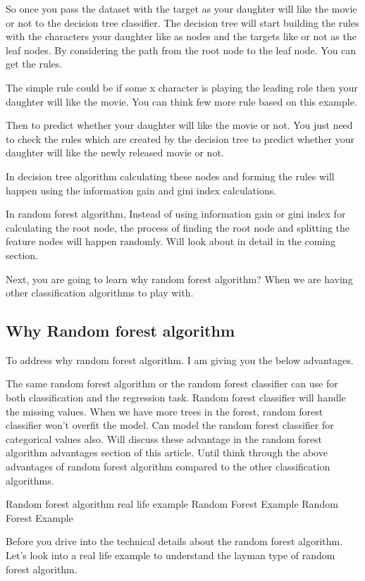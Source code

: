 \documentclass[a4paper,12pt]{article}
\begin{document}
So once you pass the dataset with the target as your daughter will like the movie or not to the decision tree classifier. The decision tree will start building the rules with the characters your daughter like as nodes and the targets like or not as the leaf nodes. By considering the path from the root node to the leaf node. You can get the rules.

The simple rule could be if some x character is playing the leading role then your daughter will like the movie. You can think few more rule based on this example.

Then to predict whether your daughter will like the movie or not. You just need to check the rules which are created by the decision tree to predict whether your daughter will like the newly released movie or not.

In decision tree algorithm calculating these nodes and forming the rules will happen using the information gain and gini index calculations.

In random forest algorithm, Instead of using information gain or gini index for calculating the root node, the process of finding the root node and splitting the feature nodes will happen randomly. Will look about in detail in the coming section.

Next, you are going to learn why random forest algorithm? When we are having other classification algorithms to play with.

\subsection*{Why Random forest algorithm}
To address why random forest algorithm. I am giving you the below advantages.

The same random forest algorithm or the random forest classifier can use for both classification and the regression task.
Random forest classifier will handle the missing values.
When we have more trees in the forest, random forest classifier won’t overfit the model.
Can model the random forest classifier for categorical values also.
Will discuss these advantage in the random forest algorithm advantages section of this article. Until think through the above advantages of random forest algorithm compared to the other classification algorithms.

Random forest algorithm real life example
Random Forest Example
Random Forest Example

Before you drive into the technical details about the random forest algorithm. Let’s look into a real life example to understand the layman type of random forest algorithm.
\end{document}
